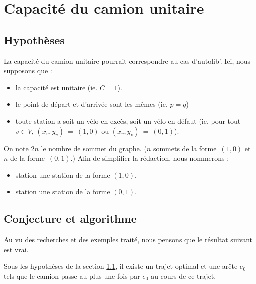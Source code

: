 \chapter{Capacité du camion unitaire}
\label{Capacite unitaire}

\section{Hypothèses}
\label{Capacité unitaire - hypothèse}

La capacité du camion unitaire pourrait correspondre au cas d'autolib'. Ici, nous supposons que :
\begin{itemize}
\item la capacité est unitaire (ie. $C=1$).
\item le point de départ et d'arrivée sont les mêmes (ie. $p=q$)
\item toute station a soit un vélo en excès, soit un vélo en défaut (ie. pour tout $v \in V$, $(x_v,y_v)~=~(1,0)$ ou $(x_v,y_v)~=~(0,1)$).
\end{itemize}
On note $2n$ le nombre de sommet du graphe. ($n$ sommets de la forme~$(1,0)$ et $n$ de la forme~$(0,1)$.) Afin de simplifier la rédaction, nous nommerons :
\begin{itemize}
\item station \plus une station de la forme $(1,0)$.
\item station \moins une station de la forme $(0,1)$.
\end{itemize}

\section{Conjecture et algorithme}
\label{capacité unitaire - conjecture et algorithme}

Au vu des recherches et des exemples traité, nous pensons que le résultat suivant est vrai.

\begin{conj} \label{conj: capacité unitaire - un passage}
Sous les hypothèses de la section \ref{Capacité unitaire - hypothèse}, il existe un trajet optimal et une arête $e_0$ tels que le camion passe au plus une fois par $e_0$ au cours de ce trajet.
\end{conj}

